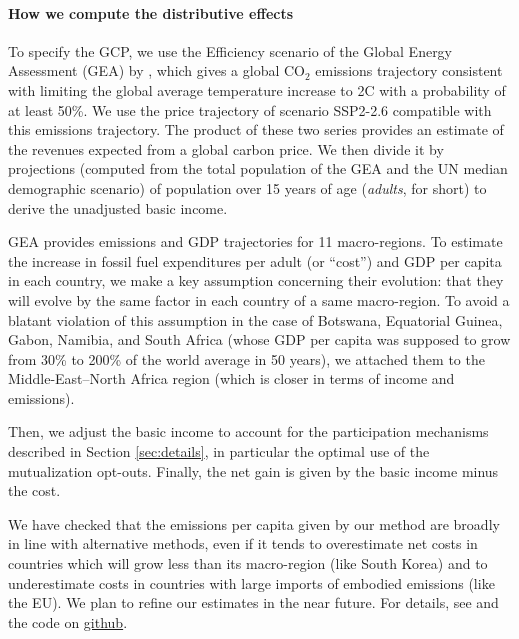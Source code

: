 \documentclass[12pt,english]{article}
\begin{document}
\begin{tcolorbox}
  {\small
  \paragraph{How we compute the distributive effects}
  To specify the GCP, we use the Efficiency scenario of the Global Energy Assessment (GEA) by \citet{johansson_global_2012}, which gives a global CO$_\text{2}$ emissions trajectory consistent with limiting the global average temperature increase to 2\textdegree{}C with a probability of at least 50\%. We use the price trajectory of scenario SSP2-2.6 \citep{fricko_marker_2017} compatible with this emissions trajectory. 
  The product of these two series provides an estimate of the revenues expected from a global carbon price. We then divide it by projections (computed from the total population of the GEA and the UN median demographic scenario) of population over 15 years of age (\textit{adults}, for short) to derive the unadjusted basic income.  

  GEA provides emissions and GDP trajectories for 11 macro-regions. To estimate the increase in fossil fuel expenditures per adult (or ``cost'') and GDP per capita in each country, we make a key assumption concerning their evolution: that they will evolve by the same factor in each country of a same macro-region. To avoid a blatant violation of this assumption in the case of Botswana, Equatorial Guinea, Gabon, Namibia, and South Africa (whose GDP per capita was supposed to grow from 30\% to 200\% of the world average in 50 years), we attached them to the Middle-East--North Africa region (which is closer in terms of income and emissions). 
  
  Then, we adjust the basic income to account for the participation mechanisms described in Section \ref{sec:details}, in particular the optimal use of the mutualization opt-outs. Finally, the net gain is given by the basic income minus the cost. 

  We have checked that the emissions per capita given by our method are broadly in line with alternative methods, even if it tends to overestimate net costs in countries which will grow less than its macro-region (like South Korea) and to underestimate costs in countries with large imports of embodied emissions (like the EU). We plan to refine our estimates in the near future. 
  For details, see \citet{fabre_international_2023} and the code on \href{https://github.com/bixiou/global_tax_attitudes/blob/main/code_global/map_GCP_incidence.R}{github}. 

}
\end{tcolorbox}
\end{document}
